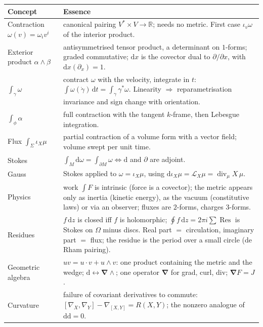 \documentclass[11pt,a4paper]{article}
\renewcommand{\arraystretch}{1.25}
\numberwithin{equation}{section}
\theoremstyle{definition}
\theoremstyle{plain}
\newcommand{\R}{\mathbb{R}}
\newcommand{\dd}{\mathrm{d}}
\newcommand{\Res}{\operatorname{Res}}
\newcommand{\Lie}{\mathcal{L}}
\newcommand{\pb}{{}^{*}}                            %
\newcommand{\vd}{\boldsymbol{\nabla}}               %
\begin{document}
{\small
\renewcommand{\arraystretch}{1.3}
\begin{longtable}{@{}p{3.6cm}p{10.4cm}@{}}
\toprule
\textbf{Concept} & \textbf{Essence}\\
\midrule
\endhead
Contraction $\omega(v)=\omega_iv^i$ & canonical pairing $V^*\times V\to\R$; needs no metric. First case $\iota_v\omega$ of the interior product.\\
Exterior product $\alpha\wedge\beta$ & antisymmetrised tensor product, a determinant on $1$-forms; graded commutative; $\dd x$ is the covector dual to $\partial/\partial x$, with $\dd x(\partial_x)=1$.\\
$\int_\gamma\omega$ & contract $\omega$ with the velocity, integrate in $t$: $\int\omega(\dot\gamma)\,\dd t=\int_\gamma\gamma\pb\omega$. Linearity $\Rightarrow$ reparametrisation invariance and sign change with orientation.\\
$\int_\phi\alpha$ & full contraction with the tangent $k$-frame, then Lebesgue integration.\\
Flux $\int_\Sigma\iota_X\mu$ & partial contraction of a volume form with a vector field; volume swept per unit time.\\
Stokes & $\int_M\dd\omega=\int_{\partial M}\omega\iff\dd$ and $\partial$ are adjoint.\\
Gauss & Stokes applied to $\omega=\iota_X\mu$, using $\dd\iota_X\mu=\Lie_X\mu=\operatorname{div}_\mu X\,\mu$.\\
Physics & work $\int F$ is intrinsic (force is a covector); the metric appears only as inertia (kinetic energy), as the vacuum (constitutive laws) or via an observer; fluxes are $2$-forms, charges $3$-forms.\\
Residues & $f\,\dd z$ is closed iff $f$ is holomorphic; $\oint f\,\dd z=2\pi i\sum\Res$ is Stokes on $\Omega$ minus discs. Real part $=$ circulation, imaginary part $=$ flux; the residue is the period over a small circle (de Rham pairing).\\
Geometric algebra & $uv=u\cdot v+u\wedge v$: one product containing the metric and the wedge; $\dd\leftrightarrow\vd\wedge$; one operator $\vd$ for grad, curl, div; $\vd F=J$.\\
Curvature & failure of covariant derivatives to commute: $[\nabla_X,\nabla_Y]-\nabla_{[X,Y]}=R(X,Y)$; the nonzero analogue of $\dd\dd=0$.\\
\bottomrule
\end{longtable}}
\end{document}
